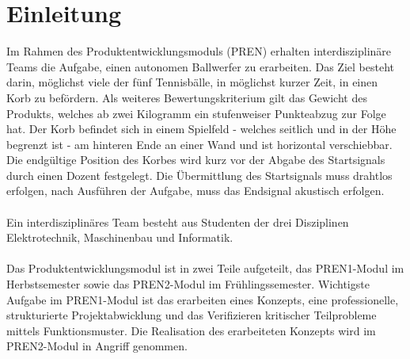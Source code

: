 \section{Einleitung}
Im Rahmen des Produktentwicklungsmoduls (PREN) erhalten interdisziplinäre Teams die Aufgabe, einen autonomen Ballwerfer zu erarbeiten. Das Ziel besteht darin, möglichst viele der fünf Tennisbälle, in möglichst kurzer Zeit, in einen Korb zu befördern. Als weiteres Bewertungskriterium gilt das Gewicht des Produkts, welches ab zwei Kilogramm ein stufenweiser Punkteabzug zur Folge hat. Der Korb befindet sich in einem Spielfeld - welches seitlich und in der Höhe begrenzt ist - am hinteren Ende an einer Wand und ist horizontal verschiebbar. Die endgültige Position des Korbes wird kurz vor der Abgabe des Startsignals durch einen Dozent festgelegt. Die Übermittlung des Startsignals muss drahtlos erfolgen, nach Ausführen der Aufgabe, muss das Endsignal akustisch erfolgen.\\
\\
Ein interdisziplinäres Team besteht aus Studenten der drei Disziplinen Elektrotechnik, Maschinenbau und Informatik.\\
\\
Das Produktentwicklungsmodul ist in zwei Teile aufgeteilt, das PREN1-Modul im Herbstsemester sowie das PREN2-Modul im Frühlingssemester. Wichtigste Aufgabe im PREN1-Modul ist das erarbeiten eines Konzepts, eine professionelle, strukturierte Projektabwicklung und das Verifizieren kritischer Teilprobleme mittels Funktionsmuster. Die Realisation des erarbeiteten Konzepts wird im PREN2-Modul in Angriff genommen. 

